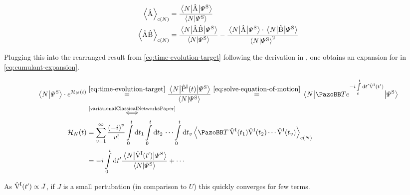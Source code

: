 \begin{equation}
    \label{eq:cumulant-expansion-coefficients}
    \begin{split}
        \left\langle\Aop\right\rangle_{\text{c}(N)} &= \frac{ \bracketHelper{N}{\Aop}{\picturePsi[\schroedingerPicture]{}}}{\braketHelper{N}{\picturePsi[\schroedingerPicture]{}}}\\
        \left\langle\Aop\Bop\right\rangle_{\text{c}(N)} &= \frac{\bracketHelper{N}{\Aop\Bop}{\picturePsi[\schroedingerPicture]{}}}{\braketHelper{N}{\picturePsi[\schroedingerPicture]{}}} -  \frac{\bracketHelper{N}{\Aop}{\picturePsi[\schroedingerPicture]{}} \cdot \bracketHelper{N}{\Bop}{\picturePsi[\schroedingerPicture]{}}}{\braketHelper{N}{\picturePsi[\schroedingerPicture]{}}^2}\\
    \end{split}
\end{equation}

Plugging this into the rearranged result from \autoref{eq:time-evolution-target} following the derivation in \cite{variationalClassicalNetworksPaper}, one obtains an expansion for \HNOft in \autoref{eq:cumulant-expansion}.

\begin{equation}
    \label{eq:cumulant-expansion}
    \begin{split}
        \braketHelper{N}{\picturePsi[\schroedingerPicture]{}} \cdot e^{\HNOft} &\stackrel{\ref{eq:time-evolution-target}}{=} \frac{\bracketHelper{N}{\timeEvolutionOperator[\interactionPicture]}{\picturePsi[\schroedingerPicture]{}}}{\braketHelper{N}{\picturePsi[\schroedingerPicture]{}}}
        \stackrel{\ref{eq:solve-equation-of-motion}}{=}
        \bracketHelper{N}{
            \timeOrderingOperator e^{-i\int\limits_0^t \text{d} t' \VhamiltonianOf[\interactionPicture]{t'}}
        }{\picturePsi[\schroedingerPicture]{}}\\
        &\stackrel{\text{\cite{variationalClassicalNetworksPaper}}}{\Longleftrightarrow}\\
        \HNOft &= \sum\limits_{v=1}^\infty \frac{\left(-i\right)^v}{v!} \int\limits_0^t\mathrm{d}t_1 \int\limits_0^t\mathrm{d}t_2 \,\,\dots \int\limits_0^t\mathrm{d}t_v \left\langle \timeOrderingOperator\, \VhamiltonianOf[\interactionPicture]{t_1}\VhamiltonianOf[\interactionPicture]{t_2} \cdots \VhamiltonianOf[\interactionPicture]{t_v} \right\rangle_{\text{c}(N)}\\
        &= -i \int\limits_0^t \mathrm{d}t' \frac{\bracketHelper{N}{\VhamiltonianOf[\interactionPicture]{t'}}{\picturePsi[\schroedingerPicture]{}}}{\braketHelper{N}{\picturePsi[\schroedingerPicture]{}}} + \cdots
    \end{split}
\end{equation}

As $\VhamiltonianOf[\interactionPicture]{t'} \propto J$, if $J$ is a small pertubation (in comparison to $U$) this quickly converges for few terms.